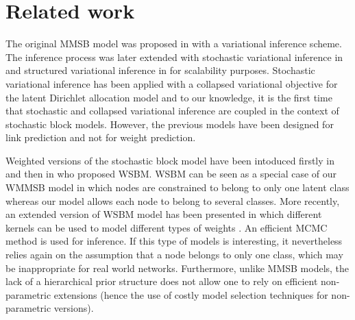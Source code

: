 \section{Related work}
\label{sec:rl}




The original MMSB model was proposed in \cite{airoldi2009mixed} with a variational inference scheme. The inference process was later extended with stochastic variational inference in \cite{gopalan2013efficient} and structured variational inference in \cite{kim2013efficient} for scalability purposes. Stochastic variational inference has been applied with a collapsed variational objective for the latent Dirichlet allocation model \cite{foulds2013stochastic} and to our knowledge, it is the first time that stochastic and collapsed variational inference are coupled in the context of stochastic block models. However, the previous models have been designed for link prediction and not for weight prediction.  

Weighted versions of the stochastic block model have been intoduced firstly in \cite{mariadassou2010} and then in \cite{aicher2014learning} who proposed WSBM. WSBM can be seen as a special case of our WMMSB model  in which nodes are constrained to belong to only one latent class whereas our model allows each node to belong to several classes. More recently, an extended version of WSBM  model has been presented  in which different kernels can be used to model different types of weights \cite{peixoto2018nonparametric}. An efficient MCMC method is used for inference. If this type of models is interesting, it nevertheless relies again on the assumption that a node belongs to only one class, which may be inappropriate for real world networks. Furthermore, unlike MMSB models, the lack of a hierarchical prior structure does not allow one to rely on efficient non-parametric extensions (hence the use of costly model selection techniques for non-parametric versions). 

